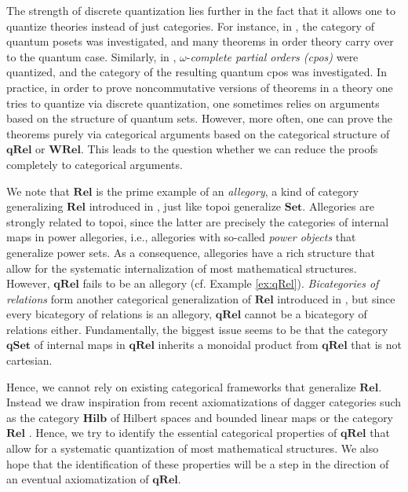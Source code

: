 \documentclass[12pt]{tac}
\theoremstyle{definition}
\theoremstyle{remark}
\newcommand{\<}{\langle}
\renewcommand{\>}{\rangle}
\renewcommand{\:}{\colon}
\begin{document}
The strength of discrete quantization lies further in the fact that it allows one to quantize theories instead of just categories. For instance, in \cite{klm-quantumposets}, the category of quantum posets was investigated, and many theorems in order theory carry over to the quantum case. Similarly, in \cite{klm-quantumcpos}, $\omega$-\emph{complete partial orders (cpos)} were quantized, and the category of the resulting quantum cpos was investigated. In practice, in order to prove noncommutative versions of theorems in a theory one tries to quantize via discrete quantization, one sometimes relies on arguments based on the structure of quantum sets. However, more often, one can prove the theorems purely via categorical arguments based on the categorical structure of $\mathbf{qRel}$ or $\mathbf{WRel}$. 
This leads to the question whether we can reduce the proofs completely to categorical arguments. 

We note that $\mathbf{Rel}$ is the prime example of an \emph{allegory}, a kind of category generalizing $\mathbf{Rel}$ introduced in \cite{allegories}, just like topoi generalize $\mathbf{Set}$. Allegories are strongly related to topoi, since the latter are precisely the categories of internal maps in power allegories, i.e., allegories with so-called \emph{power objects} that generalize power sets. As a consequence, allegories have a rich structure that allow for the systematic internalization of most mathematical structures. However, $\mathbf{qRel}$ fails to be an allegory (cf. Example \ref{ex:qRel}). \emph{Bicategories of relations} form another categorical generalization of $\mathbf{Rel}$  introduced in \cite{BiCatRel}, but since every bicategory of relations is an allegory, $\mathbf{qRel}$ cannot be a bicategory of relations either. Fundamentally, the biggest issue seems to be that the category $\mathbf{qSet}$ of internal maps in $\mathbf{qRel}$ inherits a monoidal product from $\mathbf{qRel}$ that is not cartesian. 

Hence, we cannot rely on existing categorical frameworks that generalize $\mathbf{Rel}$. Instead we draw inspiration from recent axiomatizations of dagger categories such as the category $\mathbf{Hilb}$ of Hilbert spaces and bounded linear maps \cite{heunenkornell} or the category $\mathbf{Rel}$ \cite{Kornell23}. Hence, we try to identify the essential categorical properties of $\mathbf{qRel}$ that allow for a systematic quantization of most mathematical structures. We also hope that the identification of these properties will be a step in the direction of an eventual axiomatization of $\mathbf{qRel}$. 
\end{document}
